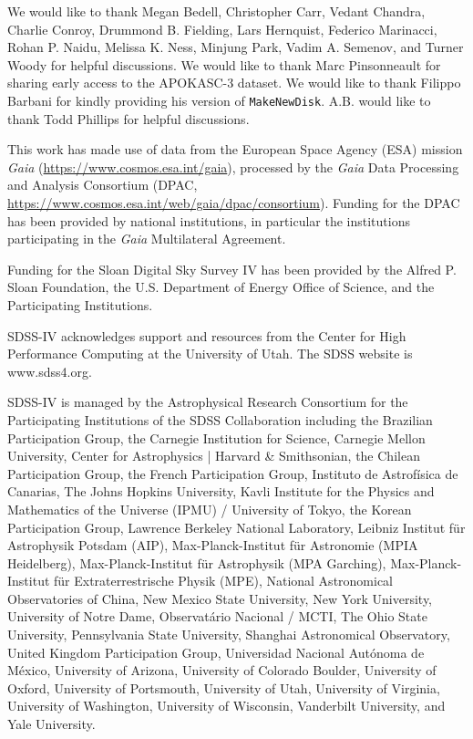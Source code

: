 \documentclass[twocolumn,linenumbers,trackchanges]{aastex631}
\begin{document}
\begin{acknowledgements}
We would like to thank Megan Bedell, Christopher Carr, Vedant Chandra, Charlie Conroy, Drummond B. Fielding, Lars Hernquist, Federico Marinacci, Rohan P. Naidu, Melissa K. Ness, Minjung Park, Vadim A. Semenov, and Turner Woody for helpful discussions. We would like to thank Marc Pinsonneault for sharing early access to the APOKASC-3 dataset. We would like to thank Filippo Barbani for kindly providing his version of \texttt{MakeNewDisk}. A.B. would like to thank Todd Phillips for helpful discussions.

This work has made use of data from the European Space Agency (ESA) mission {\it Gaia} (\url{https://www.cosmos.esa.int/gaia}), processed by the {\it Gaia} Data Processing and Analysis Consortium (DPAC, \url{https://www.cosmos.esa.int/web/gaia/dpac/consortium}). Funding for the DPAC has been provided by national institutions, in particular the institutions participating in the {\it Gaia} Multilateral Agreement.

Funding for the Sloan Digital Sky 
Survey IV has been provided by the 
Alfred P. Sloan Foundation, the U.S. 
Department of Energy Office of 
Science, and the Participating 
Institutions. 

SDSS-IV acknowledges support and 
resources from the Center for High 
Performance Computing  at the 
University of Utah. The SDSS 
website is www.sdss4.org.

SDSS-IV is managed by the 
Astrophysical Research Consortium 
for the Participating Institutions 
of the SDSS Collaboration including 
the Brazilian Participation Group, 
the Carnegie Institution for Science, 
Carnegie Mellon University, Center for 
Astrophysics | Harvard \& 
Smithsonian, the Chilean Participation 
Group, the French Participation Group, 
Instituto de Astrof\'isica de 
Canarias, The Johns Hopkins 
University, Kavli Institute for the 
Physics and Mathematics of the 
Universe (IPMU) / University of 
Tokyo, the Korean Participation Group, 
Lawrence Berkeley National Laboratory, 
Leibniz Institut f\"ur Astrophysik 
Potsdam (AIP),  Max-Planck-Institut 
f\"ur Astronomie (MPIA Heidelberg), 
Max-Planck-Institut f\"ur 
Astrophysik (MPA Garching), 
Max-Planck-Institut f\"ur 
Extraterrestrische Physik (MPE), 
National Astronomical Observatories of 
China, New Mexico State University, 
New York University, University of 
Notre Dame, Observat\'ario 
Nacional / MCTI, The Ohio State 
University, Pennsylvania State 
University, Shanghai 
Astronomical Observatory, United 
Kingdom Participation Group, 
Universidad Nacional Aut\'onoma 
de M\'exico, University of Arizona, 
University of Colorado Boulder, 
University of Oxford, University of 
Portsmouth, University of Utah, 
University of Virginia, University 
of Washington, University of 
Wisconsin, Vanderbilt University, 
and Yale University.

\end{acknowledgements}
\end{document}
